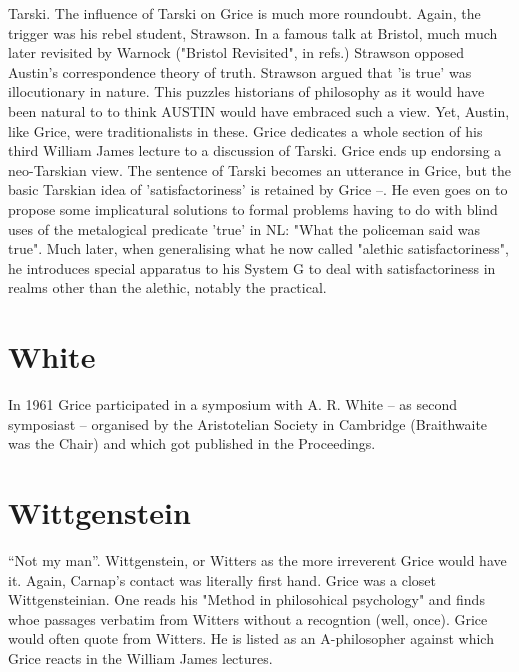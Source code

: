 \documentclass[10pt,titlepage]{book}
\begin{document}
{Tarski. The influence of Tarski on Grice is much more roundoubt. Again, the 
 trigger was his rebel student, Strawson. In a famous talk at Bristol,  
much much later revisited by Warnock ("Bristol Revisited", in refs.) Strawson  
opposed Austin's correspondence theory of truth. Strawson argued that 'is  
true' was illocutionary in nature. This puzzles historians of philosophy as 
it  would have been natural to to think AUSTIN would have embraced such a 
view.  Yet, Austin, like Grice, were traditionalists in these. Grice dedicates 
a  whole section of his third William James lecture to a discussion of 
Tarski.  Grice ends up endorsing a neo-Tarskian view. The sentence of Tarski 
becomes an  utterance in Grice, but the basic Tarskian idea of 
'satisfactoriness' is  retained by Grice --. He even goes on to propose some implicatural 
solutions to  formal problems having to do with blind uses of the metalogical 
predicate  'true' in NL: "What the policeman said was true". Much later, when 
 generalising what he now called "alethic satisfactoriness", he introduces  
special apparatus to his System G to deal with satisfactoriness in realms 
other  than the alethic, notably the practical. 

\section{White}

In 1961 Grice participated in a symposium with A. R. White -- as second  
symposiast -- organised by the Aristotelian Society in Cambridge (Braithwaite  
was the Chair) and which got published in the Proceedings.

\section{Wittgenstein}
 
“Not my man”. Wittgenstein, or Witters as the more irreverent Grice would have it.
Again, Carnap's contact was literally first hand.
Grice  was a closet Wittgensteinian.
One reads his "Method in philosohical psychology" and finds whoe passages verbatim from Witters without a 
recogntion (well, once).
Grice would often quote from Witters.
He is listed as an  A-philosopher against which Grice reacts in the William James lectures.

}
\end{document}
